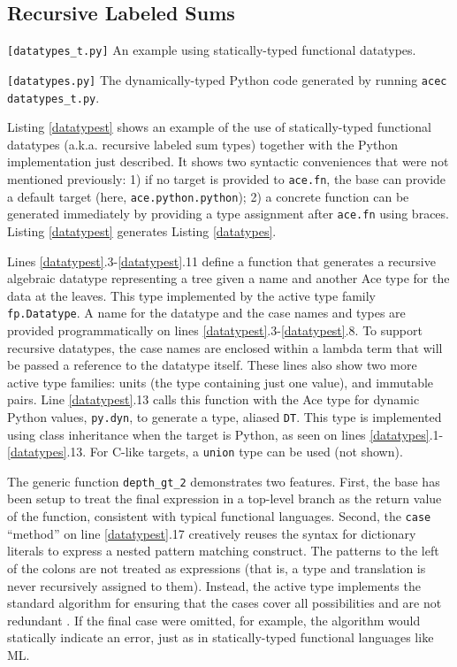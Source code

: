 \documentclass[10pt,preprint]{sigplanconf}
\begin{document}
{\subsection{Recursive Labeled Sums}
\begin{codelisting}

\caption{\texttt{[datatypes\_t.py]} An example using statically-typed functional datatypes.}
\label{datatypest}
\end{codelisting}
\begin{codelisting}

\caption{\texttt{[datatypes.py]} The dynamically-typed Python code generated by running \texttt{acec datatypes\_t.py}.}
\label{datatypes}
\end{codelisting}
Listing \ref{datatypest} shows an example of the use of statically-typed functional datatypes (a.k.a. recursive labeled sum types) together with the Python implementation just described. It shows two syntactic conveniences that were not mentioned previously: 1) if no target is provided to \verb|ace.fn|, the base can provide a default target (here, \verb|ace.python.python|); 2) a concrete function can be generated immediately by providing a type assignment after \verb|ace.fn| using braces. Listing \ref{datatypest} generates Listing \ref{datatypes}.

Lines \ref{datatypest}.3-\ref{datatypest}.11 define a function that generates a recursive algebraic datatype representing a tree given a name and another Ace type for the data at the leaves. This type implemented by the active type family \verb|fp.Datatype|. A name for the datatype and the case names and types are provided programmatically on lines \ref{datatypest}.3-\ref{datatypest}.8. To support recursive datatypes, the case names are enclosed within a lambda term that will be passed a reference to the datatype itself. These lines also show two more active type families: units (the type containing just one value), and immutable pairs. Line \ref{datatypest}.13 calls this function with the Ace type for dynamic Python values, \verb|py.dyn|, to generate a type, aliased \verb|DT|. This type is implemented using class inheritance when the target is Python, as seen on lines \ref{datatypes}.1-\ref{datatypes}.13. For C-like targets, a \verb|union| type can be used (not shown).

The generic function \verb|depth_gt_2| demonstrates two features. First, the base has been setup to treat the final expression in a top-level branch as the return value of the function, consistent with typical functional languages. Second, the \verb|case| ``method'' on line \ref{datatypest}.17 creatively reuses the syntax for dictionary literals to express a nested pattern matching construct. The patterns to the left of the colons are not treated as expressions (that is, a type and translation is never recursively assigned to them). Instead, the active type implements the standard algorithm for ensuring that the cases cover all possibilities and are not redundant \cite{pfpl}. If the final case were omitted, for example, the algorithm would statically indicate an error, just as in statically-typed functional languages like ML.

}
\end{document}
